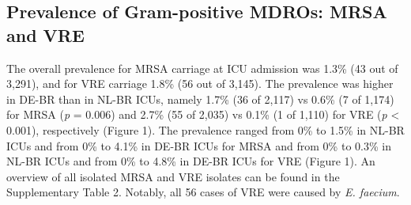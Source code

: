 \documentclass[
]{book}
\begin{document}
\hypertarget{prevalence-of-gram-positive-mdros-mrsa-and-vre}{%
\subsection{Prevalence of Gram-positive MDROs: MRSA and VRE}\label{prevalence-of-gram-positive-mdros-mrsa-and-vre}}

The overall prevalence for MRSA carriage at ICU admission was 1.3\% (43 out of 3,291), and for VRE carriage 1.8\% (56 out of 3,145). The prevalence was higher in DE-BR than in NL-BR ICUs, namely 1.7\% (36 of 2,117) vs 0.6\% (7 of 1,174) for MRSA (\emph{p} = 0.006) and 2.7\% (55 of 2,035) vs 0.1\% (1 of 1,110) for VRE (\emph{p} \textless{} 0.001), respectively (Figure 1). The prevalence ranged from 0\% to 1.5\% in NL-BR ICUs and from 0\% to 4.1\% in DE-BR ICUs for MRSA and from 0\% to 0.3\% in NL-BR ICUs and from 0\% to 4.8\% in DE-BR ICUs for VRE (Figure 1). An overview of all isolated MRSA and VRE isolates can be found in the Supplementary Table 2. Notably, all 56 cases of VRE were caused by \emph{E. faecium}.
\end{document}
